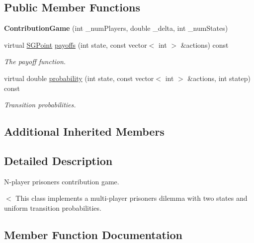 \subsection*{Public Member Functions}
\begin{DoxyCompactItemize}
\item 
\mbox{\label{classContributionGame_aa642964959782aaed1d86a0d38d32493}} 
{\bfseries Contribution\+Game} (int \+\_\+num\+Players, double \+\_\+delta, int \+\_\+num\+States)
\item 
virtual \hyperlink{classSGPoint}{S\+G\+Point} \hyperlink{classContributionGame_ab33daef685ec7b22c44dad283c2f88cd}{payoffs} (int state, const vector$<$ int $>$ \&actions) const
\begin{DoxyCompactList}\small\item\em The payoff function. \end{DoxyCompactList}\item 
virtual double \hyperlink{classContributionGame_a7b5ca7f6f0119f5899784ceae570666d}{probability} (int state, const vector$<$ int $>$ \&actions, int statep) const
\begin{DoxyCompactList}\small\item\em Transition probabilities. \end{DoxyCompactList}\end{DoxyCompactItemize}
\subsection*{Additional Inherited Members}


\subsection{Detailed Description}
N-\/player prisoners\textquotesingle{} contribution game. 

$<$ This class implements a multi-\/player prisoners\textquotesingle{} dilemma with two states and uniform transition probabilities. 

\subsection{Member Function Documentation}
\mbox{\label{classContributionGame_ab33daef685ec7b22c44dad283c2f88cd}} 
